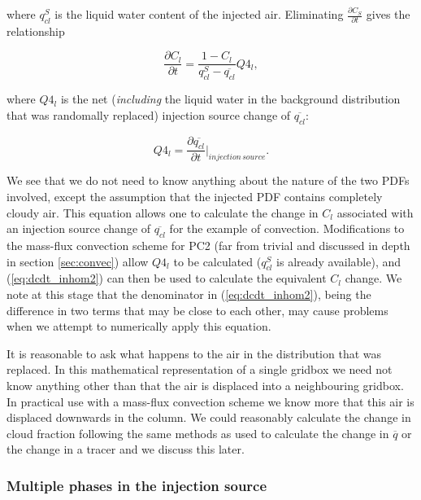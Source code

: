 \documentclass{UMDP_article}
\begin{document}
where $q_{cl}^S$ is the liquid water content of the injected
air. Eliminating $\frac{\partial{C_S}}{\partial{t}}$ gives the
relationship

\begin{equation}
\frac{\partial{C_l}}{\partial{t}} = \frac{1 - C_l}{q_{cl}^S
- \overline{q_{cl}}} Q4_l,
\label{eq:dcdt_inhom2}
\end{equation}

where $Q4_l$ is the net (\textit{including} the liquid water
in the background distribution
that was randomally replaced) injection source change of $\overline{q_{cl}}$:

\begin{equation}
Q4_l = \frac{\partial{\overline{q_{cl}}}}{\partial{t}} |_{injection \, source}.
\label{eq:q4}
\end{equation}

We see that we do not need to know anything about the nature of
the two PDFs involved, except the assumption that the injected
PDF contains completely cloudy air.
This equation allows one to calculate the change in $C_l$ associated
with an injection source change of $\overline{q_{cl}}$ for the example of
convection. Modifications
to the mass-flux convection scheme for PC2 (far from trivial and discussed
in depth in section \ref{sec:convec})
allow $Q4_l$ to be calculated ($q_{cl}^S$ is already available),
and (\ref{eq:dcdt_inhom2}) can then be used
to calculate the equivalent $C_l$ change. We note at this stage
that the denominator in (\ref{eq:dcdt_inhom2}), being the difference
in two terms that may be close to each other, may cause problems
when we attempt to numerically apply this equation.

It is reasonable to ask what happens to the air in the distribution that
was replaced. In this mathematical representation of a single gridbox we
need not know anything other than that the air is displaced into a neighbouring
gridbox. In practical use with a mass-flux convection scheme we know more that
this air is displaced downwards in the column. We could reasonably calculate
the change in cloud fraction following the same methods as used to calculate
the change in $\overline{q}$ or the change in a tracer and we discuss this
later.

\subsubsection{Multiple phases in the injection source}
\label{sec:multiple}
\end{document}
